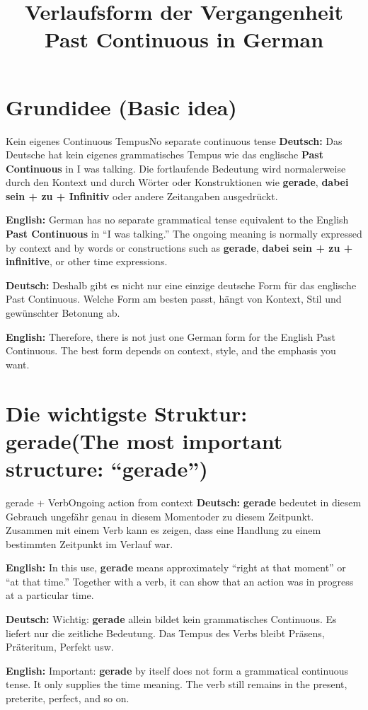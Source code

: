 \documentclass[a4paper,11pt]{article}
\title{Verlaufsform der Vergangenheit\\\large\textnormal{Past Continuous in German}}
\date{}
\newcommand{\GermanText}[1]{\textbf{Deutsch: }#1\par}
\newcommand{\EnglishText}[1]{{\small\color{SoftGray}\textbf{English: }#1\par}}
\begin{document}
    \maketitle
    \tableofcontents
    \newpage


\section{Grundidee \textnormal{(Basic idea)}}

        \begin{grammarentry}{Kein eigenes Continuous Tempus}{No separate continuous tense}
            \GermanText{Das Deutsche hat kein eigenes grammatisches Tempus wie das englische \textbf{Past Continuous} in \glqq I was talking\grqq. Die fortlaufende Bedeutung wird normalerweise durch den Kontext und durch Wörter oder Konstruktionen wie \textbf{gerade}, \textbf{dabei sein + zu + Infinitiv} oder andere Zeitangaben ausgedrückt.}
            \EnglishText{German has no separate grammatical tense equivalent to the English \textbf{Past Continuous} in ``I was talking.'' The ongoing meaning is normally expressed by context and by words or constructions such as \textbf{gerade}, \textbf{dabei sein + zu + infinitive}, or other time expressions.}

            \GermanText{Deshalb gibt es nicht nur eine einzige deutsche Form für das englische Past Continuous. Welche Form am besten passt, hängt von Kontext, Stil und gewünschter Betonung ab.}
            \EnglishText{Therefore, there is not just one German form for the English Past Continuous. The best form depends on context, style, and the emphasis you want.}
        \end{grammarentry}

\section{Die wichtigste Struktur: \glqq gerade\grqq \textnormal{(The most important structure: ``gerade'')}}

        \begin{grammarentry}{gerade + Verb}{Ongoing action from context}
            \GermanText{\textbf{gerade} bedeutet in diesem Gebrauch ungefähr \glqq genau in diesem Moment\grqq oder \glqq zu diesem Zeitpunkt\grqq. Zusammen mit einem Verb kann es zeigen, dass eine Handlung zu einem bestimmten Zeitpunkt im Verlauf war.}
            \EnglishText{In this use, \textbf{gerade} means approximately ``right at that moment'' or ``at that time.'' Together with a verb, it can show that an action was in progress at a particular time.}

            \GermanText{Wichtig: \textbf{gerade} allein bildet kein grammatisches Continuous. Es liefert nur die zeitliche Bedeutung. Das Tempus des Verbs bleibt Präsens, Präteritum, Perfekt usw.}
            \EnglishText{Important: \textbf{gerade} by itself does not form a grammatical continuous tense. It only supplies the time meaning. The verb still remains in the present, preterite, perfect, and so on.}
        \end{grammarentry}
\end{document}
